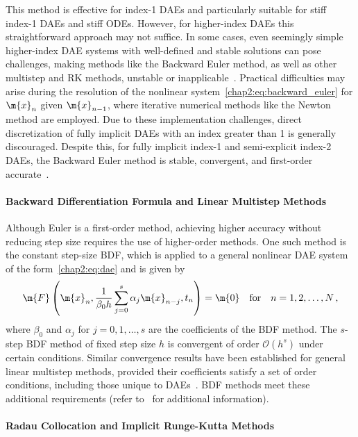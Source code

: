 This method is effective for index-1 \acp{DAE} and particularly suitable for stiff index-1 \acp{DAE} and stiff \acp{ODE}. However, for higher-index \acp{DAE} this straightforward approach may not suffice. In some cases, even seemingly simple higher-index \ac{DAE} systems with well-defined and stable solutions can pose challenges, making methods like the Backward Euler method, as well as other multistep and \ac{RK} methods, unstable or inapplicable~\cite{ascher1998computer}. Practical difficulties may arise during the resolution of the nonlinear system~\eqref{chap2:eq:backward_euler} for $\m{x}_n$ given $\m{x}_{n-1}$, where iterative numerical methods like the Newton method are employed. Due to these implementation challenges, direct discretization of fully implicit \acp{DAE} with an index greater than 1 is generally discouraged. Despite this, for fully implicit index-1 and semi-explicit index-2 \acp{DAE}, the Backward Euler method is stable, convergent, and first-order accurate~\cite{brenan1995numerical, hairer1999stiff}.

\paragraph{Backward Differentiation Formula and Linear Multistep Methods}

Although Euler is a first-order method, achieving higher accuracy without reducing step size requires the use of higher-order methods. One such method is the constant step-size \ac{BDF}, which is applied to a general nonlinear \ac{DAE} system of the form~\eqref{chap2:eq:dae} and is given by
%
\begin{equation*}
  \m{F}\left(\m{x}_n, \dfrac{1}{\beta_0 h} \sum_{j=0}^{s} \alpha_j \m{x}_{n-j}, t_n\right) = \m{0} \quad \text{for} \quad n = 1, 2, \dots, N \, \text{,}
\end{equation*}
%
where $\beta_0$ and $\alpha_j$ for $j = 0, 1, \dots, s$ are the coefficients of the \ac{BDF} method. The $s$-step \ac{BDF} method of fixed step size $h$ is convergent of order $\mathcal{O}(h^s)$ under certain conditions. Similar convergence results have been established for general linear multistep methods, provided their coefficients satisfy a set of order conditions, including those unique to \acp{DAE}~\cite{brenan1995numerical}. \ac{BDF} methods meet these additional requirements (refer to~\cite{brenan1995numerical} for additional information).

\paragraph{Radau Collocation and Implicit Runge-Kutta Methods}


